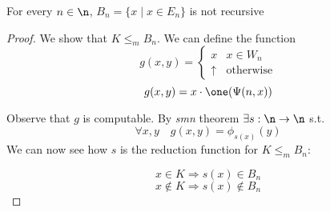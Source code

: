 
\begin{example}
  For every \(n \in \n\), \(B_n = \{x \mid x \in E_n\}\) is not
  recursive

  \begin{proof}
    We show that \(K \leq_m B_n\). We can define the function
    \[
    g(x,y) =
    \begin{cases}
      x & x \in W_n \\
      \uparrow & \text{otherwise}
    \end{cases}
    \]
    \[g(x,y) = x \cdot \one (\Psi(n,x))\]

    Observe that \(g\) is computable. By \textit{smn} theorem
    \(\exists s : \n \to \n\) s.t. \[\forall x,y \quad g(x,y) =
    \phi_{s(x)}(y)\] We can now see how \(s\) is the reduction
    function for \(K \leq_m B_n\):
    
    \[x \in K \Rightarrow s(x) \in B_n \]
    \[ x \not\in K \Rightarrow s(x) \not\in B_n\]

  \end{proof}
\end{example}
